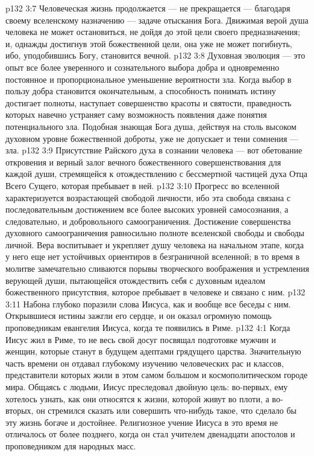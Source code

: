 \vs p132 3:7 Человеческая жизнь продолжается --- не прекращается --- благодаря своему вселенскому назначению --- задаче отыскания Бога. Движимая верой душа человека не может остановиться, не дойдя до этой цели своего предназначения; и, однажды достигнув этой божественной цели, она уже не может погибнуть, ибо, уподобившись Богу, становится вечной.
\vs p132 3:8 \pc Духовная эволюция --- это опыт все более уверенного и сознательного выбора добра и одновременно постоянное и пропорциональное уменьшение вероятности зла. Когда выбор в пользу добра становится окончательным, а способность понимать истину достигает полноты, наступает совершенство красоты и святости, праведность которых навечно устраняет саму возможность появления даже понятия потенциального зла. Подобная знающая Бога душа, действуя на столь высоком духовном уровне божественной доброты, уже не допускает и тени сомнения --- зла.
\vs p132 3:9 Присутствие Райского духа в сознании человека --- вот обетование откровения и верный залог вечного божественного совершенствования для каждой души, стремящейся к отождествлению с бессмертной частицей духа Отца Всего Сущего, которая пребывает в ней.
\vs p132 3:10 Прогресс во вселенной характеризуется возрастающей свободой личности, ибо эта свобода связана с последовательным достижением все более высоких уровней самосознания, а следовательно, и добровольного самоограничения. Достижение совершенства духовного самоограничения равносильно полноте вселенской свободы и свободы личной. Вера воспитывает и укрепляет душу человека на начальном этапе, когда у него еще нет устойчивых ориентиров в безграничной вселенной; в то время в молитве замечательно сливаются порывы творческого воображения и устремления верующей души, пытающейся отождествить себя с духовным идеалом божественного присутствия, которое пребывает в человеке и связано с ним.
\vs p132 3:11 \pc Набона глубоко поразили слова Иисуса, как и вообще все беседы с ним. Открывшиеся истины зажгли его сердце, и он оказал огромную помощь проповедникам евангелия Иисуса, когда те появились в Риме.
\vs p132 4:1 Когда Иисус жил в Риме, то не весь свой досуг посвящал подготовке мужчин и женщин, которые станут в будущем адептами грядущего царства. Значительную часть времени он отдавал глубокому изучению человеческих рас и классов, представители которых жили в этом самом большом и космополитическом городе мира. Общаясь с людьми, Иисус преследовал двойную цель: во\hyp{}первых, ему хотелось узнать, как они относятся к жизни, которой живут во плоти, а во\hyp{}вторых, он стремился сказать или совершить что\hyp{}нибудь такое, что сделало бы эту жизнь богаче и достойнее. Религиозное учение Иисуса в это время не отличалось от более позднего, когда он стал учителем двенадцати апостолов и проповедником для народных масс.
